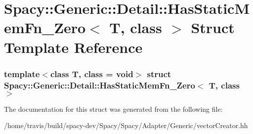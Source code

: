 \hypertarget{structSpacy_1_1Generic_1_1Detail_1_1HasStaticMemFn__Zero}{\section{\-Spacy\-:\-:\-Generic\-:\-:\-Detail\-:\-:\-Has\-Static\-Mem\-Fn\-\_\-\-Zero$<$ \-T, class $>$ \-Struct \-Template \-Reference}
\label{structSpacy_1_1Generic_1_1Detail_1_1HasStaticMemFn__Zero}
}
\subsubsection*{template$<$class T, class = void$>$ struct Spacy\-::\-Generic\-::\-Detail\-::\-Has\-Static\-Mem\-Fn\-\_\-\-Zero$<$ T, class $>$}



\-The documentation for this struct was generated from the following file\-:\begin{DoxyCompactItemize}
\item 
/home/travis/build/spacy-\/dev/\-Spacy/\-Spacy/\-Adapter/\-Generic/vector\-Creator.\-hh\end{DoxyCompactItemize}
